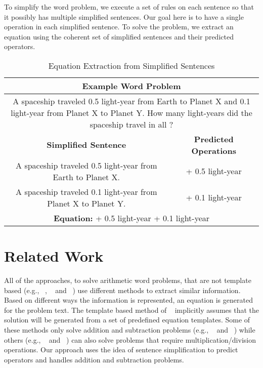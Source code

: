 \documentclass[11pt]{article}
\begin{document}
To simplify the word problem, we execute a set of rules on each sentence so that it possibly has multiple simplified sentences. Our goal here is to have a single operation in each simplified sentence. To solve the problem, we extract an equation using the coherent set of simplified sentences and their predicted operators.
\begin{table}[h]
\fontsize{9}{9}
\begin{tabularx}{7.9cm}{|c|c|}
\hline 
\multicolumn{2}{|c|}{\bf{Example Word Problem}} \\ \hline
\multicolumn{2}{|p{7cm}|}{\small A spaceship traveled 0.5 light-year from Earth to Planet X and 0.1 light-year from Planet X to Planet Y. How many light-years did the spaceship travel in all ?} \\ \hline
\multicolumn{1}{|m{5cm}|}{\bf \centering Simplified Sentence} & \multicolumn{1}{m{2cm}|}{\bf \centering Predicted Operations} \\ \hline
\multicolumn{1}{|m{5cm}|}{\small A spaceship traveled 0.5 light-year from Earth to Planet X.} & \multicolumn{1}{m{2cm}|}{\small \centering + 0.5 light-year} \\ \hline
\multicolumn{1}{|m{5cm}|}{\small A spaceship traveled 0.1 light-year from Planet X to Planet Y.} & \multicolumn{1}{m{2cm}|}{\small \centering + 0.1 light-year} \\ \hline
\multicolumn{2}{|m{7cm}|}{\small \centering \textbf{Equation:}  + 0.5 light-year + 0.1 light-year} \\ \hline
\end{tabularx}
\caption{\small \label{figure:1} Equation Extraction from Simplified Sentences }
\end{table}

\section{Related Work}
All of the approaches, to solve arithmetic word problems, that are not template based (e.g., ~\cite{ARIS:14}, ~\cite{RoyT:15} and ~\cite{RoyR:15}) use different methods to extract similar information. Based on different ways the information is represented, an equation is generated for the problem text. The template based method of ~\cite{Kushman:14} implicitly assumes that the solution will be generated from a set of predefined equation templates. Some of these methods only solve addition and subtraction problems (e.g., ~\cite{ARIS:14} and ~\cite{RoyT:15}) while others (e.g., ~\cite{RoyR:15} and ~\cite{Kushman:14}) can also solve problems that require multiplication/division operations. Our approach uses the idea of sentence simplification to predict operators and handles addition and subtraction problems.
\end{document}
